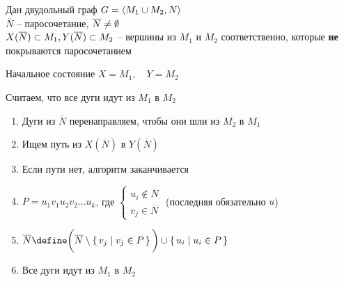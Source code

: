 \begin{algorithm}
    Дан двудольный граф $ G = \braket{M_1 \cup M_2, N} $ \\
    $ \overline{N} $ -- паросочетание, $ \overline{N} \ne \emptyset $ \\
    $ X(\overline{N}) \subset M_1, Y(\overline{N}) \subset M_2 $ -- вершины из $ M_1 $ и $ M_2 $ соответственно, которые \textbf{не} покрываются паросочетанием \\
    \begin{undefthm}{Начальное состояние}
    	$ X = M_1, \quad Y = M_2 $
    \end{undefthm}
    Считаем, что все дуги идут из $ M_1 $ в $ M_2 $
    \begin{enumerate}
        \item Дуги из $ \overline{N} $ перенаправляем, чтобы они шли из $ M_2 $ в $ M_1 $
        \item Ищем путь из $ X(\overline{N}) $ в $ Y(\overline{N}) $
        \item Если пути нет, алгоритм заканчивается
        \item $ P = u_1v_1u_2v_2...u_k $, где $
        \begin{cases}
            u_i \notin \overline{N} \\
            v_j \in \overline{N}
        \end{cases} $ (последняя обязательно $ u $)
        \item $ \overline{N} \define \bigg( \overline{N} \setminus \set{v_j | v_j \in P} \bigg) \cup \set{u_i | u_i \in P} $
        \item Все дуги идут из $ M_1 $ в $ M_2 $
    \end{enumerate}
\end{algorithm}

\begin{algo}
    \item
\end{algo}
